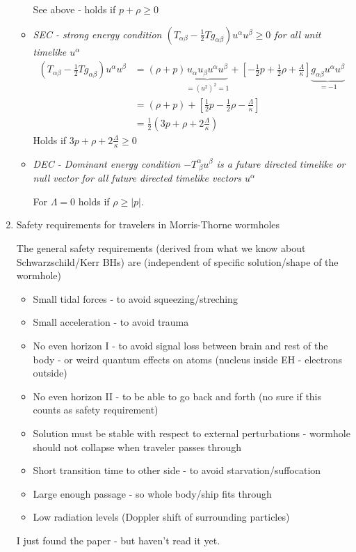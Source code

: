\documentclass[10pt,a4paper]{article}
\theoremstyle{definition}
\begin{document}
\begin{enumerate}
\begin{itemize}
See above - holds if $p+\rho\ge0$
\item {\it SEC - strong energy condition $(T_{\alpha\beta}-\frac{1}{2}Tg_{\alpha\beta})u^\alpha u^\beta\ge0$ for all unit timelike $u^\alpha$}
\begin{align}
(T_{\alpha\beta}-\frac{1}{2}T g_{\alpha\beta})u^\alpha u^\beta
&=(\rho+p)\underbrace{u_\alpha u_\beta u^\alpha u^\beta}_{=(u^2)^2=1}+\left[-\frac{1}{2}p+\frac{1}{2}\rho+\frac{\Lambda}{\kappa}\right]\underbrace{g_{\alpha\beta}u^\alpha u^\beta}_{=-1}\\
&=(\rho+p)+\left[\frac{1}{2}p-\frac{1}{2}\rho-\frac{\Lambda}{\kappa}\right]\\
&=\frac{1}{2}\left(3p+\rho+2\frac{\Lambda}{\kappa}\right)
\end{align}
Holds if $3p+\rho+2\frac{\Lambda}{\kappa}\ge0$

\item {\it DEC - Dominant energy condition $-T^\alpha_{\;\beta}u^\beta$ is a future directed timelike or null vector for all future directed timelike vectors $u^\alpha$}

For $\Lambda=0$ holds if $\rho\ge|p|$.
\end{itemize}

\item Safety requirements for travelers in Morris-Thorne wormholes

The general safety requirements (derived from what we know about Schwarzschild/Kerr BHs) are (independent of specific solution/shape of the wormhole)
\begin{itemize}
\item Small tidal forces - to avoid squeezing/streching
\item Small acceleration - to avoid trauma
\item No even horizon I - to avoid signal loss between brain and rest of the body - or weird quantum effects on atoms (nucleus inside EH - electrons outside)
\item No even horizon II - to be able to go back and forth (no sure if this counts as safety requirement)
\item Solution must be stable with respect to external perturbations - wormhole should not collapse when traveler passes through
\item Short transition time to other side - to avoid starvation/suffocation
\item Large enough passage - so whole body/ship fits through
\item Low radiation levels (Doppler shift of surrounding particles)
\end{itemize} 
I just found the paper - but haven't read it yet.


\end{enumerate}
\end{document}
